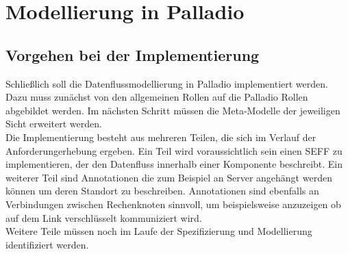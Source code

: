 

\section{Modellierung in Palladio}
\subsection{Vorgehen bei der Implementierung}
Schließlich soll die Datenflussmodellierung in Palladio implementiert werden. Dazu muss zunächst von den allgemeinen Rollen auf die Palladio Rollen abgebildet werden. Im nächsten Schritt müssen die Meta-Modelle der jeweiligen Sicht erweitert werden. \\
Die Implementierung besteht aus mehreren Teilen, die sich im Verlauf der Anforderungerhebung ergeben. Ein Teil wird voraussichtlich sein einen SEFF zu implementieren, der den Datenfluss innerhalb einer Komponente beschreibt. Ein weiterer Teil sind Annotationen die zum Beispiel an Server angehängt werden können um deren Standort zu beschreiben. Annotationen sind ebenfalls an Verbindungen zwischen Rechenknoten sinnvoll, um beispielsweise anzuzeigen ob auf dem Link verschlüsselt kommuniziert wird. \\
Weitere Teile müssen noch im Laufe der Spezifizierung und Modellierung identifiziert werden.

